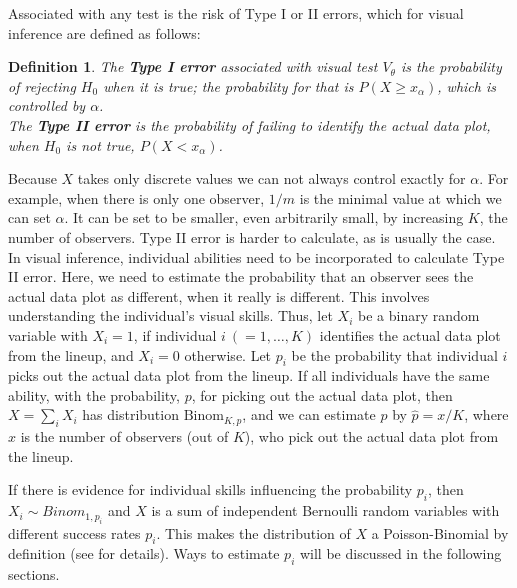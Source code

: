 \documentclass[12pt]{article}
\newcommand{\green}[1]{{\color{green} #1}} %
\newcommand{\hh}[1]{{\color{orange} #1}} %
\newtheorem{dfn}{Definition}[section]
\begin{document}
\noindent
Associated with any test is the risk of  Type I or II errors, which for visual inference are defined as follows: 

\begin{dfn}\label{dfn:error}
The \textbf{Type I error} associated with visual test $V_{\theta}$ is the probability of rejecting $H_0$ when it is true; the probability for that is $P(X \ge x_{\alpha})$, which is controlled by $\alpha$.\\ \noindent
The \textbf{Type II error} is the probability of failing to identify the actual data plot, when $H_0$ is not true, $P( X <  x_{\alpha})$.
\end{dfn}


\noindent Because $X$ takes only discrete values we can not always control exactly for $\alpha$. %
For example, when there is only one observer, $1/m$ is the minimal value at which we can set $\alpha$. It can be set to be smaller, even arbitrarily small, by increasing $K$, the number of observers. 
Type II error is harder to calculate, as is usually the case. In visual inference, individual abilities need to be incorporated to calculate Type II error. %
Here, we need to estimate the probability that an observer sees the actual data plot as different, when it really is different. This involves understanding the individual's visual skills. Thus, let $X_i$ be a binary random variable with $X_i = 1$, if individual $i \ (=1, \dots , K)$ identifies the actual data plot from the lineup, and $X_i = 0$ otherwise. Let $p_i$ be the probability that individual $i$ picks out the actual data plot from the lineup. If all individuals have the same ability, with the probability, $p$, for picking out the actual data plot, then $X = \sum_i X_i$ has distribution $\text{Binom}_{K, p}$, and we can estimate $p$ by $\hat{p} = x/K$, where $x$ is the number of observers (out of $K$), who pick out the actual data plot from the lineup. 


If there is evidence for individual skills influencing the probability $p_i$, then $X_i \sim Binom_{1, p_i}$ and $X$ is a sum of independent Bernoulli random variables with different success rates $p_i$. This makes the distribution of $X$ a Poisson-Binomial by definition (see \citet{butler93} for details). Ways to estimate $p_i$ will be  discussed in the following sections.
\end{document}
